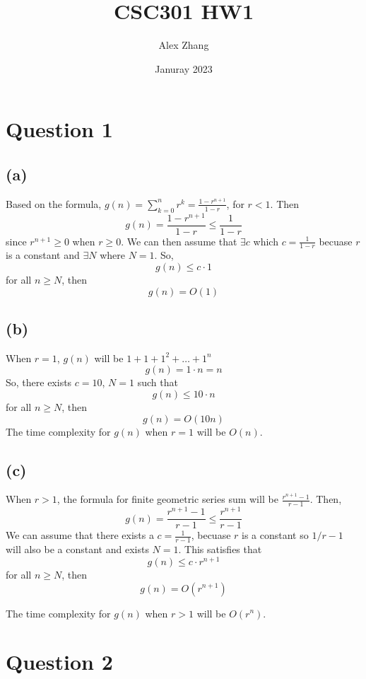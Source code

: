 \documentclass{article}
\title{CSC301 HW1}
\author{Alex Zhang}
\date{Januray 2023}
\begin{document}
\maketitle
\section{Question 1}
    \subsection{(a)}
    Based on the formula, $g(n) = \sum_{k=0}^{n} r^k = \frac{1-r^{n+1}}{1-r}$, for $r < 1$.
Then
    $$g(n) = \frac{1-r^{n+1}}{1-r} \leq \frac{1}{1-r} $$
since $r^{n+1} \geq 0$ when  $r \geq 0$.
We can then assume that $\exists c$ which $c = \frac{1}{1-r}$ becuase $r$ is a constant
and $\exists N$ where $N = 1$.
So,
$$g(n) \leq c \cdot 1$$
for all $n \geq N$, then 
$$g(n) = O(1)$$

    \subsection{(b)}
    When $r = 1$, $g(n)$ will be $1 + 1 + 1^2 + \dots  + 1^n$
$$g(n) =  1\cdot n = n$$
So, there exists $c = 10$, $N = 1$ such that 
$$g(n) \leq  10 \cdot n$$
for all $n \geq N$, then 
$$g(n) = O(10n)$$
The time complexity for $g(n)$ when $r=1$ will be $O(n)$.
    \subsection{(c)}
    When $r > 1$, the formula for finite geometric series sum will be $\frac{r^{n+1}-1}{r-1}$.
Then, 
$$g(n) = \frac{r^{n+1}-1}{r-1} \leq \frac{r^{n+1}}{r-1}$$
We can assume that there exists a $c = \frac{1}{r-1}$, becuase $r$ is a constant so $1/r-1$ will also be a constant and exists $N = 1$.
This satisfies that 
$$g(n) \leq c \cdot r^{n+1}$$
for all $n \geq N$, then 
$$g(n) = O(r^{n+1})$$

The time complexity for $g(n)$ when $r > 1$ will be $O(r^n)$.



\section{Question 2}
\end{document}
